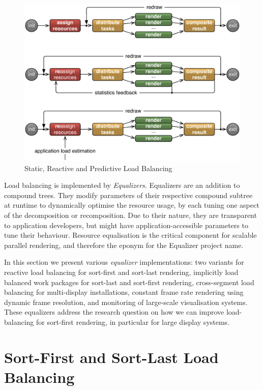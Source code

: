\begin{figure}[h!t]
  \includegraphics[width=\textwidth]{images/loadBalancing}
  \caption{\label{floadbalancing}Static, Reactive and Predictive Load Balancing}
\end{figure}

Load balancing is implemented by {\em Equalizers}. Equalizers are an addition
to compound trees. They modify parameters of their respective compound subtree
at runtime to dynamically optimise the resource usage, by each tuning one
aspect of the decomposition or recomposition. Due to their nature, they are
transparent to application developers, but might have application-accessible
parameters to tune their behaviour. Resource equalisation is the critical
component for scalable parallel rendering, and therefore the eponym for the
\textsf{Equalizer} project name.

In this section we present various {\em equalizer} implementations: two
variants for reactive load balancing for sort-first and sort-last rendering,
implicitly load balanced work packages for sort-last and sort-first rendering,
cross-segment load balancing for multi-display installations, constant frame
rate rendering using dynamic frame resolution, and monitoring of large-scale
visualisation systems. These equalizers address the research question on how we can improve load-balancing for sort-first rendering, in particular for large display systems.

\section{Sort-First and Sort-Last Load Balancing}\label{sLoadEqualizer}

